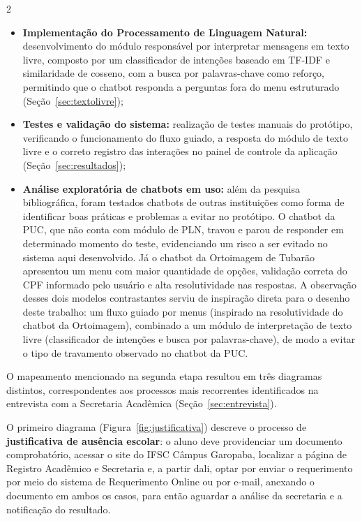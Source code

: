\documentclass[10pt]{article}
\begin{document}
\begin{multicols}{2}
\begin{itemize}
  \item \textbf{Implementação do Processamento de Linguagem Natural:}
  desenvolvimento do módulo responsável por interpretar mensagens em texto livre, composto por um classificador de intenções baseado em TF-IDF e similaridade de cosseno, com a busca por palavras-chave como reforço, permitindo que o chatbot responda a perguntas fora do menu estruturado (Seção~\ref{sec:textolivre});

  \item \textbf{Testes e validação do sistema:} realização de testes
  manuais do protótipo, verificando o funcionamento do fluxo guiado, a
  resposta do módulo de texto livre e o correto registro das interações
  no painel de controle da aplicação (Seção~\ref{sec:resultados});

  \item \textbf{Análise exploratória de chatbots em uso:} além da
  pesquisa bibliográfica, foram testados chatbots de outras instituições
  como forma de identificar boas práticas e problemas a evitar no
  protótipo. O chatbot da PUC, que não conta com módulo de PLN, travou e
  parou de responder em determinado momento do teste, evidenciando um
  risco a ser evitado no sistema aqui desenvolvido. Já o chatbot da
  Ortoimagem de Tubarão apresentou um menu com maior quantidade de
  opções, validação correta do CPF informado pelo usuário e alta
  resolutividade nas respostas. A observação desses dois modelos
  contrastantes serviu de inspiração direta para o desenho deste
  trabalho: um fluxo guiado por menus (inspirado na resolutividade do
  chatbot da Ortoimagem), combinado a um módulo de interpretação de texto livre (classificador de intenções e busca por palavras-chave), de modo a evitar o tipo de travamento
  observado no chatbot da PUC.
\end{itemize}

O mapeamento mencionado na segunda etapa resultou em três diagramas
distintos, correspondentes aos processos mais recorrentes identificados
na entrevista com a Secretaria Acadêmica (Seção~\ref{sec:entrevista}).

O primeiro diagrama (Figura~\ref{fig:justificativa}) descreve o processo de \textbf{justificativa de
ausência escolar}: o aluno deve providenciar um documento comprobatório,
acessar o site do IFSC Câmpus Garopaba, localizar a página de Registro
Acadêmico e Secretaria e, a partir dali, optar por enviar o requerimento
por meio do sistema de Requerimento Online ou por e-mail, anexando o
documento em ambos os casos, para então aguardar a análise da secretaria
e a notificação do resultado.

\end{multicols}
\end{document}
